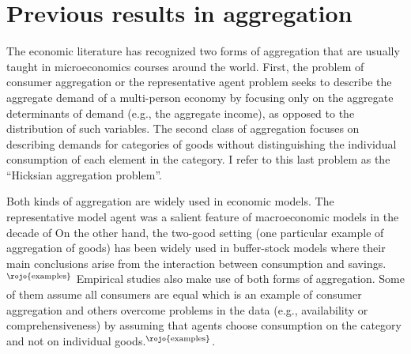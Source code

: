 \documentclass[english, a4paper,12pt]{article}
\begin{document}

\section{Previous results in aggregation} \label{sec:PrevResults}
The economic literature has recognized two forms of aggregation that are usually taught in microeconomics courses around the world. First, the problem of consumer aggregation or the representative agent problem seeks to describe the aggregate demand of a multi-person economy by focusing only on the aggregate determinants of demand (e.g., the aggregate income), as opposed to the distribution of such variables. The second class of aggregation focuses on describing demands for categories of goods without distinguishing the individual consumption of each element in the category. I refer to this last problem as the ``Hicksian aggregation problem''.

Both kinds of aggregation are widely used in economic models. The representative model agent was a salient feature of macroeconomic models in the decade of  On the other hand, the two-good setting (one particular example of aggregation of goods) has been widely used in buffer-stock models where their main conclusions arise from the interaction between consumption and savings.$^{\text{\rojo{examples}}}$ Empirical studies also make use of both forms of aggregation. Some of them assume all consumers are equal which is an example of consumer aggregation and others overcome problems in the data (e.g., availability or comprehensiveness) by assuming that agents choose consumption on the category and not on individual goods.$^{\text{\rojo{examples}}}$.
\end{document}
